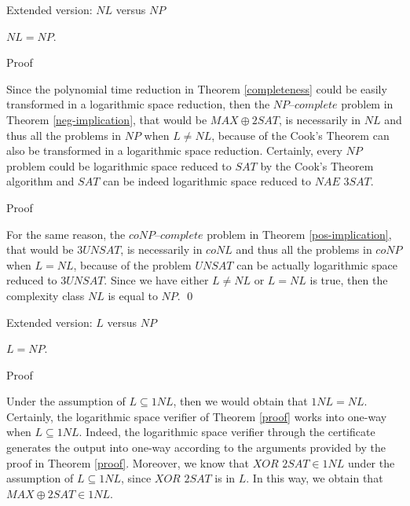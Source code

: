 \documentclass[11pt]{beamer}
\begin{document}
\begin{frame}{Extended version: $NL$ versus $NP$}

\begin{theorem}
\label{nl}
$NL = NP$.
\end{theorem}

\end{frame}

\begin{frame}{Proof}

Since the polynomial time reduction in Theorem \ref{completeness} could be easily transformed in a logarithmic space reduction, then the $\textit{NP--complete}$ problem in Theorem \ref{neg-implication}, that would be $MAX\oplus2SAT$, is necessarily in $NL$ and thus all the problems in $NP$ when $L \neq NL$, because of the Cook's Theorem can also be transformed in a logarithmic space reduction. Certainly, every $NP$ problem could be logarithmic space reduced to $SAT$ by the Cook's Theorem algorithm and $SAT$ can be indeed logarithmic space reduced to $\textit{NAE 3SAT}$.

\end{frame}

\begin{frame}{Proof}

For the same reason, the $\textit{coNP--complete}$ problem in Theorem \ref{pos-implication}, that would be $3UNSAT$, is necessarily in $coNL$ and thus all the problems in $coNP$ when $L = NL$, because of the problem $UNSAT$ can be actually logarithmic space reduced to $3UNSAT$. Since we have either $L \neq NL$ or $L = NL$ is true, then the complexity class $NL$ is equal to $NP$. \qed

\end{frame}

\begin{frame}{Extended version: $L$ versus $NP$}

\begin{theorem}
$L = NP$.
\end{theorem}

\end{frame}

\begin{frame}{Proof}

Under the assumption of $L \subseteq 1NL$, then we would obtain that $1NL = NL$. Certainly, the logarithmic space verifier of Theorem \ref{proof} works into one-way when $L \subseteq 1NL$. Indeed, the logarithmic space verifier through the certificate generates the output into one-way according to the arguments provided by the proof in Theorem \ref{proof}. Moreover, we know that $\textit{XOR 2SAT} \in 1NL$ under the assumption of $L \subseteq 1NL$, since $\textit{XOR 2SAT}$ is in $L$. In this way, we obtain that $MAX\oplus2SAT \in 1NL$.
\end{frame}
\end{document}
